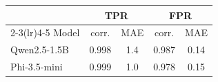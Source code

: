 \begin{tabular}{lcccc}
\toprule
 & \multicolumn{2}{c}{TPR} & \multicolumn{2}{c}{FPR} \\
\cmidrule(lr){2-3}\cmidrule(lr){4-5}
Model & corr. & MAE & corr. & MAE \\
\midrule
Qwen2.5-1.5B & 0.998 & 1.4 & 0.987 & 0.14 \\
Phi-3.5-mini & 0.999 & 1.0 & 0.978 & 0.15 \\
\bottomrule
\end{tabular}
